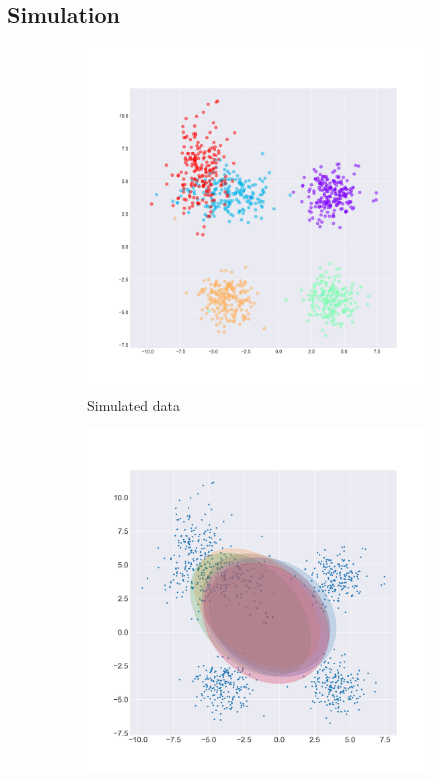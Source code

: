 \documentclass[letterpaper]{article}
\begin{document}
\subsection{Simulation}
\begin{figure}[H]
  \centering
  \begin{subfigure}[b]{0.25\linewidth}
    \includegraphics[width=\linewidth]{outputs/report_figs/simulation_original.jpeg}
     \caption{Simulated data}
  \end{subfigure}
  \begin{subfigure}[b]{0.25\linewidth}
    \includegraphics[width=\linewidth]{outputs/simulation/iter_10.png}

\end{subfigure}
\end{figure}
\end{document}
